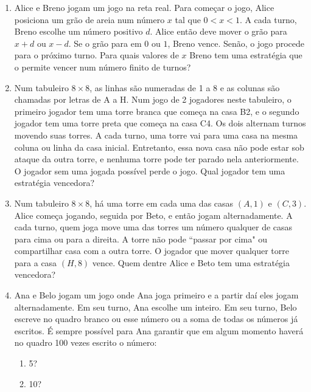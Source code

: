 \documentclass{article}
\begin{document}
\begin{enumerate}
    \item Alice e Breno jogam um jogo na reta real.
    Para começar o jogo, Alice posiciona um grão de areia num número $x$ tal que $0<x<1$.
    A cada turno, Breno escolhe um número positivo $d$.
    Alice então deve mover o grão para $x+d$ ou $x-d$.
    Se o grão para em $0$ ou $1$, Breno vence.
    Senão, o jogo procede para o próximo turno.
    Para quais valores de $x$ Breno tem uma estratégia que o permite vencer num número finito de turnos?
    
    \item Num tabuleiro $8\times 8$, as linhas são numeradas de 1 a 8
    e as colunas são chamadas por letras de A a H.
    Num jogo de 2 jogadores neste tabuleiro,
    o primeiro jogador tem uma torre branca que começa na casa B2,
    e o segundo jogador tem uma torre preta que começa na casa C4.
    Os dois alternam turnos movendo suas torres.
    A cada turno, uma torre vai para uma casa na mesma coluna ou linha da casa inicial.
    Entretanto, essa nova casa não pode estar sob ataque da outra torre,
    e nenhuma torre pode ter parado nela anteriormente.
    O jogador sem uma jogada possível perde o jogo.
    Qual jogador tem uma estratégia vencedora?
    
    \item Num tabuleiro $8\times 8$, há uma torre em cada uma das casas $(A,1)$ e $(C,3)$.
    Alice começa jogando, seguida por Beto, e então jogam alternadamente.
    A cada turno, quem joga move uma das torres um número qualquer de casas para cima ou para a direita.
    A torre não pode ``passar por cima" ou compartilhar casa com a outra torre.
    O jogador que mover qualquer torre para a casa $(H,8)$ vence.
    Quem dentre Alice e Beto tem uma estratégia vencedora?
    
    \item Ana e Belo jogam um jogo onde Ana joga primeiro e a partir daí eles jogam alternadamente.
    Em seu turno, Ana escolhe um inteiro.
    Em seu turno, Belo escreve no quadro branco ou esse número ou a soma de todas os números já escritos.
    É sempre possível para Ana garantir que em algum momento haverá no quadro 100 vezes escrito o número:
    
    \begin{enumerate}
    \item 5?
    
    \item 10?
    \end{enumerate}
\end{enumerate}
\end{document}
